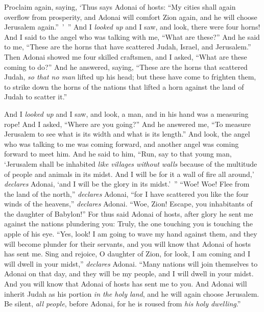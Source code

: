 \begin{biblechapter}
\verse Proclaim again, saying, ‘Thus says Adonai of hosts: “My cities shall again overflow from prosperity, and Adonai will comfort Zion again, and he will choose Jerusalem again.” ’ ”
  And I \textit{looked up} and I saw, and look, there were four horns!
\verse And I said to the angel who was talking with me, “What are these?” And he said to me, “These are the horns that have scattered Judah, Israel, and Jerusalem.”
\verse Then Adonai showed me four skilled craftsmen,
\verse and I asked, “What are these coming to do?” And he answered, saying, “These are the horns that scattered Judah, \textit{so that no man} lifted up his head; but these have come to frighten them, to strike down the horns of the nations that lifted a horn against the land of Judah to scatter it.”
\end{biblechapter}

\begin{biblechapter} %
 And I \textit{looked up} and I saw, and look, a man, and in his hand was a measuring rope!
\verse And I asked, “Where are you going?” And he answered me, “To measure Jerusalem to see what is its width and what is its length.”
\verse And look, the angel who was talking to me was coming forward, and another angel was coming forward to meet him.
\verse And he said to him, “Run, say to that young man, ‘Jerusalem shall be inhabited \textit{like villages without walls} because of the multitude of people and animals in its midst.
\verse And I will be for it a wall of fire all around,’ \textit{declares} Adonai, ‘and I will be the glory in its midst.’ ”
\verse “Woe! Woe! Flee from the land of the north,” \textit{declares} Adonai, “for I have scattered you like the four winds of the heavens,” \textit{declares} Adonai.
\verse “Woe, Zion! Escape, you inhabitants of the daughter of Babylon!”
\verse For thus said Adonai of hosts, after glory he sent me against the nations plundering you: Truly, the one touching you is touching the apple of his eye.
\verse “Yes, look! I am going to wave my hand against them, and they will become plunder for their servants, and you will know that Adonai of hosts has sent me.
\verse Sing and rejoice, O daughter of Zion, for look, I am coming and I will dwell in your midst,” \textit{declares} Adonai.
\verse “Many nations will join themselves to Adonai on that day, and they will be my people, and I will dwell in your midst. And you will know that Adonai of hosts has sent me to you.
\verse And Adonai will inherit Judah as his portion \textit{in the holy land}, and he will again choose Jerusalem.
\verse Be silent, \textit{all people}, before Adonai, for he is roused from \textit{his holy dwelling}.”
\end{biblechapter}

